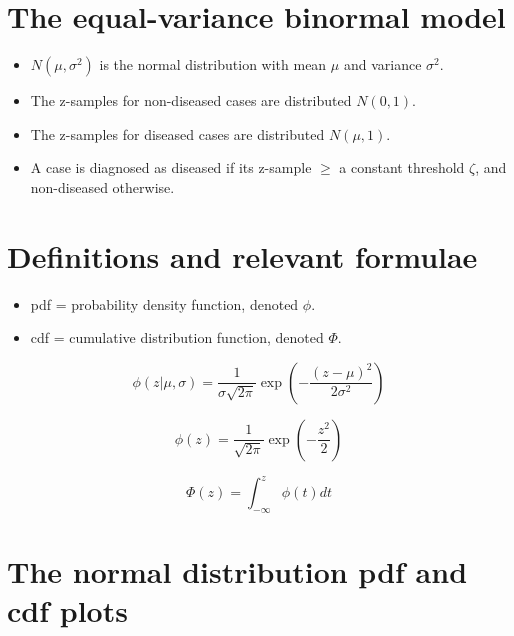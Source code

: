 \documentclass[
]{book}
\providecommand{\tightlist}{%
  \setlength{\itemsep}{0pt}\setlength{\parskip}{0pt}}
\begin{document}
\hypertarget{the-equal-variance-binormal-model}{%
\section{The equal-variance binormal model}\label{the-equal-variance-binormal-model}}

\begin{itemize}
\tightlist
\item
  \(N(\mu,\sigma^2)\) is the normal distribution with mean \(\mu\) and variance \(\sigma^2\).
\item
  The z-samples for non-diseased cases are distributed \(N(0,1)\).
\item
  The z-samples for diseased cases are distributed \(N(\mu,1)\).
\item
  A case is diagnosed as diseased if its z-sample \(\geq\) a constant threshold \(\zeta\), and non-diseased otherwise.
\end{itemize}

\hypertarget{definitions-and-relevant-formulae}{%
\section{Definitions and relevant formulae}\label{definitions-and-relevant-formulae}}

\begin{itemize}
\tightlist
\item
  pdf = probability density function, denoted \(\phi\).
\item
  cdf = cumulative distribution function, denoted \(\Phi\).
\end{itemize}

\begin{equation} 
\phi\left ( z|\mu,\sigma \right )=\frac{1}{\sigma\sqrt{2\pi}}\exp\left ( -\frac{(z-\mu)^2}{2\sigma^2} \right )
\label{eq:binaryTask-phi}
\end{equation}

\begin{equation} 
\phi\left ( z \right )=\frac{1}{\sqrt{2\pi}}\exp\left ( -\frac{z^2}{2} \right )
\label{eq:binaryTask-phi-normalized}
\end{equation}

\begin{equation} 
\Phi\left ( z \right )=\int_{-\infty }^{z}\phi(t)dt
\label{eq:binaryTask-Phi}
\end{equation}

\hypertarget{the-normal-distribution-pdf-and-cdf-plots}{%
\section{The normal distribution pdf and cdf plots}\label{the-normal-distribution-pdf-and-cdf-plots}}
\end{document}
